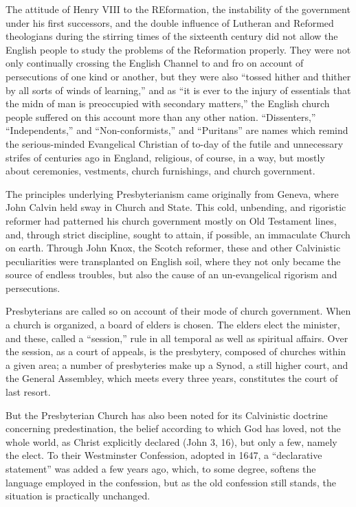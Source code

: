 \documentclass[
]{book}
\begin{document}
The attitude of Henry VIII to the REformation, the instability of the government under his first successors, and the double influence of Lutheran and Reformed theologians during the stirring times of the sixteenth century did not allow the English people to study the problems of the Reformation properly. They were not only continually crossing the English Channel to and fro on account of persecutions of one kind or another, but they were also ``tossed hither and thither by all sorts of winds of learning,'' and as ``it is ever to the injury of essentials that the midn of man is preoccupied with secondary matters,'' the English church people suffered on this account more than any other nation. ``Dissenters,'' ``Independents,'' and ``Non-conformists,'' and ``Puritans'' are names which remind the serious-minded Evangelical Christian of to-day of the futile and unnecessary strifes of centuries ago in England, religious, of course, in a way, but mostly about ceremonies, vestments, church furnishings, and church government.

The principles underlying Presbyterianism came originally from Geneva, where John Calvin held sway in Church and State. This cold, unbending, and rigoristic reformer had patterned his church government mostly on Old Testament lines, and, through strict discipline, sought to attain, if possible, an immaculate Church on earth. Through John Knox, the Scotch reformer, these and other Calvinistic peculiarities were transplanted on English soil, where they not only became the source of endless troubles, but also the cause of an un-evangelical rigorism and persecutions.

Presbyterians are called so on account of their mode of church government. When a church is organized, a board of elders is chosen. The elders elect the minister, and these, called a ``session,'' rule in all temporal as well as spiritual affairs. Over the session, as a court of appeals, is the presbytery, composed of churches within a given area; a number of presbyteries make up a Synod, a still higher court, and the General Assembley, which meets every three years, constitutes the court of last resort.

But the Presbyterian Church has also been noted for its Calvinistic doctrine concerning predestination, the belief according to which God has loved, not the whole world, as Christ explicitly declared (John 3, 16), but only a few, namely the elect. To their Westminster Confession, adopted in 1647, a ``declarative statement'' was added a few years ago, which, to some degree, softens the language employed in the confession, but as the old confession still stands, the situation is practically unchanged.
\end{document}
